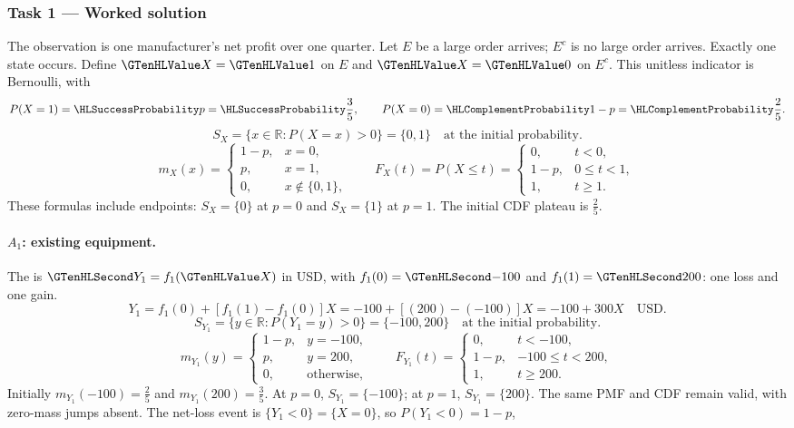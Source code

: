 \subsubsection*{Task 1 --- Worked solution}\label{sol:c3-manufacturing-model}
The observation is one manufacturer's net profit over one quarter. Let $E$ be a large order arrives; $E^c$ is no large order arrives. Exactly one state occurs. Define $\Indicator{X}=\Indicator{1}$ on $E$ and $\Indicator{X}=\Indicator{0}$ on $E^c$. This unitless indicator is Bernoulli, with
\[P(X=1)=\SuccessProb{p}=\SuccessProb{\frac{3}{5}},\qquad P(X=0)=\FailureProb{1-p}=\FailureProb{\frac{2}{5}}.\]
\[S_X=\{x\in\mathbb R:P(X=x)>0\}=\{0,1\}\quad\text{at the initial probability}.\]
\[m_X(x)=\begin{cases}1-p,&x=0,\\p,&x=1,\\0,&x\notin\{0,1\},\end{cases}\qquad F_X(t)=P(X\leq t)=\begin{cases}0,&t<0,\\1-p,&0\leq t<1,\\1,&t\geq1.\end{cases}\]
These formulas include endpoints: $S_X=\{0\}$ at $p=0$ and $S_X=\{1\}$ at $p=1$. The initial CDF plateau is $\frac{2}{5}$.
\paragraph{$A_1$: existing equipment.}
The  is $\Money{Y_1}=f_1(\Indicator{X})$ in USD,
with $f_1(0)=\Money{-100}$ and $f_1(1)=\Money{200}$: one loss and one gain.
\[
Y_1=f_1(0)+[f_1(1)-f_1(0)]X=-100+[(200)-(-100)]X=-100+300X\quad\text{USD}.
\]
\[S_{Y_1}=\{y\in\mathbb R:P(Y_1=y)>0\}=\{-100,200\}\quad\text{at the initial probability}.\]
\[
m_{Y_1}(y)=\begin{cases}1-p,&y=-100,\\p,&y=200,\\0,&\text{otherwise},\end{cases}
\qquad F_{Y_1}(t)=\begin{cases}0,&t<-100,\\1-p,&-100\leq t<200,\\1,&t\geq 200.\end{cases}
\]
Initially $m_{Y_1}(-100)=\frac{2}{5}$ and $m_{Y_1}(200)=\frac{3}{5}$.
At $p=0$, $S_{Y_1}=\{-100\}$; at $p=1$, $S_{Y_1}=\{200\}$.
The same PMF and CDF remain valid, with zero-mass jumps absent.
The net-loss event is $\{Y_1<0\}=\{X=0\}$, so $P(Y_1<0)=1-p$,
